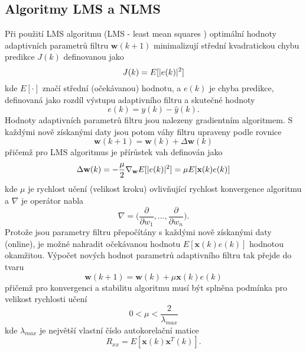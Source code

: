 \subsection{Algoritmy LMS a NLMS} \label{chap:nlms}
 Při použití LMS algoritmu (LMS - least mean squares \cite{haykin}) optimální hodnoty adaptivních parametrů filtru $\textbf{w}(k+1)$ minimalizují střední kvadratickou chybu predikce $J(k)$ definovanou jako
 \begin{equation}
     J(k)=E[\lvert e(k)\rvert^2]
 \end{equation}
 kde $E[\cdot]$ značí střední (očekávanou) hodnotu, a $e(k)$ je chyba predikce, definovaná jako rozdíl výstupu adaptivního filtru a skutečné hodnoty
 \begin{equation}
     e(k)=y(k)-\hat{y}(k).
 \end{equation}
 Hodnoty adaptivních parametrů filtru jsou nalezeny gradientním algoritmem. S každými nově získanými daty jsou potom váhy filtru upraveny podle rovnice
\begin{equation}
    \textbf{w}(k+1)=\textbf{w}(k)+\Delta\textbf{w}(k)
\end{equation}
přičemž pro LMS algoritmus je přírůstek vah definován jako
\begin{equation}
    \Delta\textbf{w}(k)=-\frac{\mu}{2} \nabla_{\textbf{w}} E[\lvert e(k)\rvert^2]=\mu E[\textbf{x}(k)e(k)]
\end{equation}
kde  $\mu$ je rychlost učení (velikost kroku) ovlivňující rychlost konvergence algoritmu a $\nabla$ je operátor nabla
\begin{equation}
    \nabla =\Bigg(\frac{\partial}{\partial w_1},\dots,\frac{\partial}{\partial w_n}\Bigg).
\end{equation}
Protože jsou parametry filtru přepočítány s každými nově získanými daty (online), je možné nahradit očekávanou hodnotu $E[\textbf{x}(k)e(k)]$ hodnotou okamžitou. Výpočet nových hodnot parametrů adaptivního filtru tak přejde do tvaru
\begin{equation}
    \textbf{w}(k+1)=\textbf{w}(k)+\mu\textbf{x}(k)e(k)
\end{equation}
přičemž pro konvergenci a stabilitu algoritmu musí být splněna podmínka pro velikost rychlosti učení
\begin{equation}
    0 < \mu < \frac{2}{\lambda_{max}}
\end{equation}
kde $\lambda_{max}$ je největší vlastní číslo autokorelační matice 
\begin{equation}
    R_{xx}=E[\textbf{x}(k)\textbf{x}^T(k)].
\end{equation}
